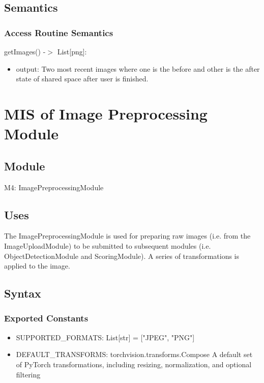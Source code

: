 \documentclass[12pt, titlepage]{article}
\begin{document}
\subsection{Semantics}


\subsubsection{Access Routine Semantics}

\noindent getImages() -$>$ List[png]:
\begin{itemize}
\item output: Two most recent images where one is the before and other is the after state of shared space after user is finished.
\end{itemize}

\newpage


\section{MIS of Image Preprocessing Module} \label{Module} 

\subsection{Module}

M4: ImagePreprocessingModule

\subsection{Uses}
The ImagePreprocessingModule is used for preparing raw images (i.e. from the ImageUploadModule) to be submitted to subsequent modules (i.e. ObjectDetectionModule and ScoringModule). A series of transformations is applied to the image.

\subsection{Syntax}

\subsubsection{Exported Constants}

\begin{itemize}
  \item SUPPORTED{\_}FORMATS: List[str] = ["JPEG", "PNG"]
  \item DEFAULT{\_}TRANSFORMS: torchvision.transforms.Compose\: A default set of PyTorch transformations, including resizing, normalization, and optional filtering
\end{itemize}
\end{document}
